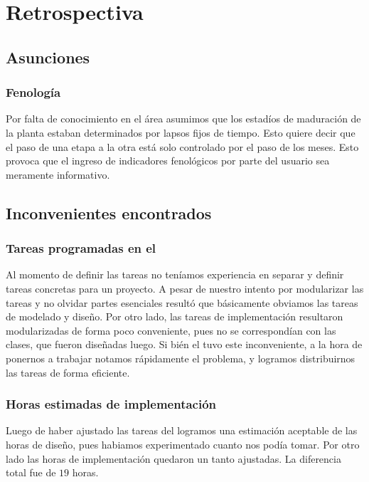 \section{Retrospectiva}

  \subsection{Asunciones}
    \subsubsection{Fenolog\'ia}
      Por falta de conocimiento en el \'area asumimos que los estad\'ios de maduraci\'on
      de la planta estaban determinados por lapsos fijos de tiempo. Esto quiere decir que
      el paso de una etapa a la otra est\'a solo controlado por el paso de los meses. 
      Esto provoca que el ingreso de indicadores fenol\'ogicos por parte del usuario
      sea meramente informativo.  

  \subsection{Inconvenientes encontrados}
    \subsubsection{Tareas programadas en el \sprintback{}}
      Al momento de definir las tareas no ten\'iamos experiencia en separar y definir
      tareas concretas para un proyecto. A pesar de nuestro intento por modularizar
      las tareas y no olvidar partes esenciales result\'o que b\'asicamente obviamos
      las tareas de modelado y dise\~no. Por otro lado, las tareas de implementaci\'on
      resultaron modularizadas de forma poco conveniente, pues no se correspond\'ian
      con las clases, que fueron dise\~nadas luego. Si bi\'en el \sprintback{} tuvo
      este inconveniente, a la hora de ponernos a trabajar notamos r\'apidamente
      el problema, y logramos distribuirnos las tareas de forma eficiente.
    \subsubsection{Horas estimadas de implementaci\'on}
      Luego de haber ajustado las tareas del \sprintback{} logramos una
      estimaci\'on aceptable de las horas de dise\~no, pues habiamos experimentado cuanto
      nos pod\'ia tomar. Por otro lado las horas de implementaci\'on quedaron un tanto
      ajustadas. La diferencia total fue de $19$ horas.

